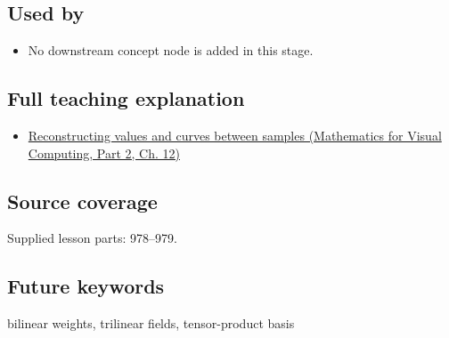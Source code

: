 \subsection{Used by}\label{appendix-0a09b6dfdc86-used-by}

\hypertarget{appendix-0a09b6dfdc86-used-by}{}

\begin{itemize}
\tightlist
\item
  No downstream concept node is added in this stage.
\end{itemize}

\subsection{Full teaching explanation}\label{appendix-0a09b6dfdc86-full-teaching-explanation}

\hypertarget{appendix-0a09b6dfdc86-full-teaching-explanation}{}

\begin{itemize}
\tightlist
\item
  \href{../02-Mathematics-for-Visual-Computing-P02/main.pdf\#02-foundations-ii-ch028-reconstructing-values-and-curves-between-samples}{Reconstructing values and curves between samples (Mathematics for Visual Computing, Part 2, Ch. 12)}
\end{itemize}

\subsection{Source coverage}\label{appendix-0a09b6dfdc86-source-coverage}

\hypertarget{appendix-0a09b6dfdc86-source-coverage}{}

Supplied lesson parts: 978--979.

\subsection{Future keywords}\label{appendix-0a09b6dfdc86-future-keywords}

\hypertarget{appendix-0a09b6dfdc86-future-keywords}{}

bilinear weights, trilinear fields, tensor-product basis
